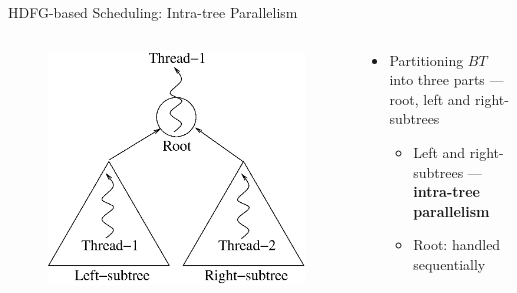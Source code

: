 \documentclass{beamer}
\begin{document}
\begin{CJK}{UTF8}{bkai}
            \begin{frame}{HDFG-based Scheduling: Intra-tree Parallelism}
                \begin{columns}
                    \begin{column}{0.45\textwidth}
                        \begin{figure}[!ht] 
                            \centering
                            \includegraphics[width=1.0\textwidth]{./figs/partition}
                            \label{fig:archi}
                        \end{figure}
                    \end{column}
                    \begin{column}{0.6\textwidth}
                        \begin{itemize}
                            \pause
                            \item {Partitioning $BT$ into three parts --- root, left and right-subtrees
                                \begin{itemize}
                                    \item Left and right-subtrees --- \textbf{intra-tree parallelism}
                                    \item Root: handled sequentially
                                \end{itemize}
                            }

\end{itemize}
\end{column}
\end{columns}
\end{frame}
\end{CJK}
\end{document}
